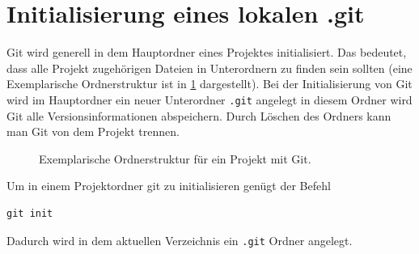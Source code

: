 \section{Initialisierung eines lokalen .git}
Git wird generell in dem Hauptordner eines Projektes initialisiert. Das bedeutet, dass alle Projekt zugehörigen Dateien in Unterordnern zu finden sein sollten (eine Exemplarische Ordnerstruktur ist in \ref{fig:dir_struc} dargestellt). Bei der Initialisierung von Git wird im Hauptordner ein neuer Unterordner  \lstinline[style=inline]{.git} angelegt in diesem Ordner wird Git alle Versionsinformationen abspeichern. Durch Löschen des Ordners kann man Git von dem Projekt trennen.
\begin{figure}[!h]
    \caption{Exemplarische Ordnerstruktur für ein Projekt mit Git.}
    \label{fig:dir_struc}
\end{figure}

Um in einem Projektordner git zu initialisieren genügt der Befehl 
\begin{lstlisting}[style=my]
git init
\end{lstlisting}
Dadurch wird in dem aktuellen Verzeichnis ein \lstinline[style=inline]{.git} Ordner angelegt.
